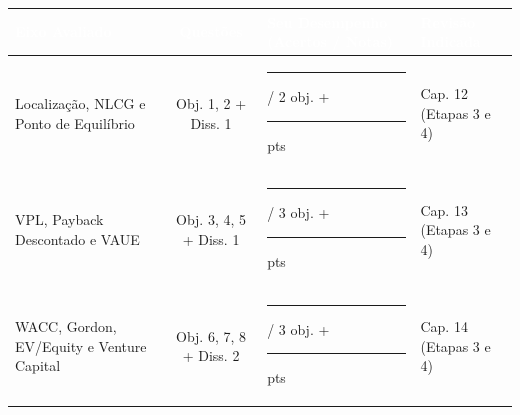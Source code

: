 \renewcommand{\arraystretch}{1.25}
\small
\begin{center}
\begin{tabular}{@{}p{4.6cm} c p{5.5cm} p{2.8cm}@{}}
  \toprule
  \rowcolor{etIndigo}
  \textcolor{white}{\bfseries Eixo Avaliado} & \textcolor{white}{\bfseries Questões} & \textcolor{white}{\bfseries Seu Desempenho (Acertos / Notas)} & \textcolor{white}{\bfseries Revisão Indicada} \\
  \midrule
  Localização, NLCG e Ponto de Equilíbrio & Obj. 1, 2 + Diss. 1 & \rule{2.5cm}{0.4pt} / 2 obj. + \rule{1.2cm}{0.4pt} pts & Cap. 12 (Etapas 3 e 4) \\
  \rowcolor{bgGray}
  VPL, Payback Descontado e VAUE & Obj. 3, 4, 5 + Diss. 1 & \rule{2.5cm}{0.4pt} / 3 obj. + \rule{1.2cm}{0.4pt} pts & Cap. 13 (Etapas 3 e 4) \\
  WACC, Gordon, EV/Equity e Venture Capital & Obj. 6, 7, 8 + Diss. 2 & \rule{2.5cm}{0.4pt} / 3 obj. + \rule{1.2cm}{0.4pt} pts & Cap. 14 (Etapas 3 e 4) \\
  \bottomrule
\end{tabular}
\end{center}
\normalsize
